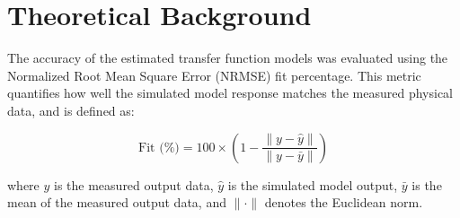 \section{Theoretical Background}

The accuracy of the estimated transfer function models was evaluated using the Normalized Root Mean Square Error (NRMSE) fit percentage. This metric quantifies how well the simulated model response matches the measured physical data, and is defined as:

\begin{equation}
    \text{Fit (\%)} = 100 \times \left( 1 - \frac{\lVert y - \hat{y} \rVert}{\lVert y - \bar{y} \rVert} \right)
    \label{eq:nrmse}
\end{equation}

where $y$ is the measured output data, $\hat{y}$ is the simulated model output, $\bar{y}$ is the mean of the measured output data, and $\lVert \cdot \rVert$ denotes the Euclidean norm.